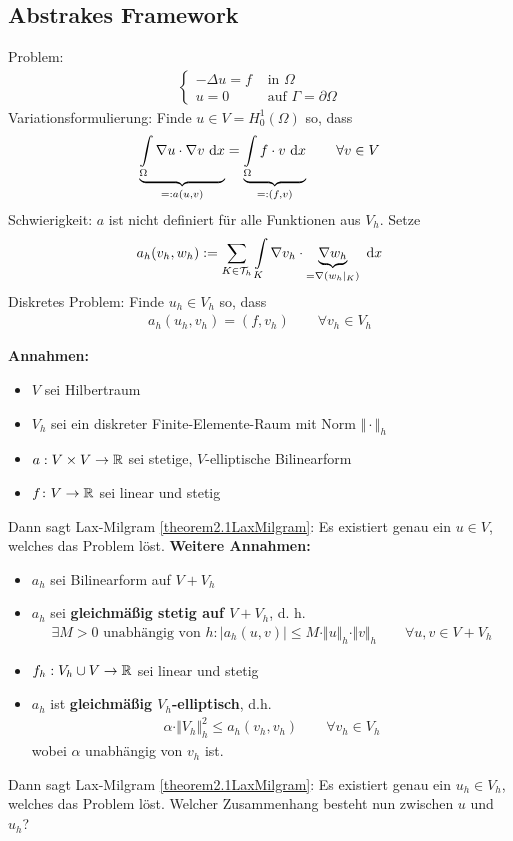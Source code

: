 \subsection{Abstrakes Framework}
Problem:
\begin{align*}
\left\lbrace\begin{array}{rl}
	-\Delta u=f&\text{ in }\Omega\\
	u=0& \text{ auf }\Gamma=\partial\Omega
\end{array}\right.
\end{align*}
Variationsformulierung: Finde $u\in V=H_0^1(\Omega)$ so, dass
\begin{align*}
\underbrace{\int\limits_\Omega\nabla u\cdot\nabla v\text{ d} x}_{=:a(u,v)}=\underbrace{\int\limits_\Omega f\cdot v\text{ d} x}_{=:(f,v)}\qquad\forall v\in V
\end{align*}
Schwierigkeit: $a$ ist nicht definiert für alle Funktionen aus $V_h$. Setze
\begin{align*}
	a_h(v_h,w_h):=\sum\limits_{K\in\mathcal{T}_h}\int\limits_K\nabla v_h\cdot\underbrace{\nabla w_h}_{=\nabla(w_h|_K)}\text{ d} x
\end{align*}
Diskretes Problem: Finde $u_h\in V_h$ so, dass
\begin{align*}
a_h(u_h,v_h)=(f,v_h)\qquad\forall v_h\in V_h
\end{align*}

\textbf{Annahmen:}
\begin{itemize}
\item $V$ sei Hilbertraum
\item $V_h$ sei ein diskreter Finite-Elemente-Raum mit Norm $\Vert\cdot\Vert_h$
\item $a:V\times V\to\mathbb{R}$ sei stetige, $V$-elliptische Bilinearform  
\item $f\colon V\to\mathbb{R}$ sei linear und stetig
\end{itemize}
Dann sagt Lax-Milgram \ref{theorem2.1LaxMilgram}: Es existiert genau ein $u\in V$, welches das Problem löst.\nl
\textbf{Weitere Annahmen:}
\begin{itemize}
\item $a_h$ sei Bilinearform auf $V+ V_h$ %
\item $a_h$ sei \textbf{gleichmäßig stetig auf $V+ V_h$}, d. h.
\begin{align*}
\exists M>0\text{ unabhängig von }h:\big|a_h(u,v)\big|\leq M\cdot\Vert u\Vert_h\cdot\Vert v\Vert_h\qquad\forall u,v\in V+ V_h
\end{align*}
\item $f_h:V_h\cup V\to\mathbb{R}$ sei linear und stetig
\item $a_h$ ist \textbf{gleichmäßig $V_h$-elliptisch}, d.h.
\begin{align*}
\alpha\cdot\Vert V_h\Vert^2_h\leq a_h(v_h,v_h)\qquad\forall v_h\in V_h
\end{align*}
wobei $\alpha$ unabhängig von $v_h$ ist.
\end{itemize}
Dann sagt Lax-Milgram \ref{theorem2.1LaxMilgram}: Es existiert genau ein $u_h\in V_h$, welches das Problem löst. Welcher Zusammenhang besteht nun zwischen $u$ und $u_h$?

